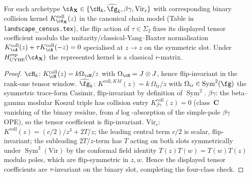 \begin{corollary}
\label{cor:r-matrix-sigma2-symmetric}
For each archetype $\cA_\mathbf{X}\in\{\cH_k,\widehat{\fg}_k,
\beta\gamma,\mathrm{Vir}_c\}$ with corresponding binary collision
kernel $K^{\mathrm{coll}}_{\cA_\mathbf{X}}(z)$ in the canonical chain model
(Table in \texttt{landscape\_census.tex}), the flip action of
$\tau\in\Sigma_2$ fixes its displayed tensor coefficient modulo the
unitarity/classical-Yang--Baxter normalisation
$K_\cA^{\mathrm{coll}}(z)
+\tau K_\cA^{\mathrm{coll}}(-z)=0$ specialised at $z\to z$ on the
symmetric slot.  Under~$H_{\mathrm{CYBE}}^{\mathrm{rep}}(\cA_\mathbf X)$
the represented kernel is a classical $r$-matrix.
\end{corollary}

\begin{proof}
$\cH_k$: $K^{\mathrm{coll}}_{\cH}(z)=k\Omega_{\cH}/z$ with
$\Omega_{\cH}=J\otimes J$, hence flip-invariant in the rank-one tensor
window. $\widehat{\fg}_k$: $K^{\mathrm{coll},KM}(z)=k\,\Omega_{\mathrm{tr}}/z$
with $\Omega_{\mathrm{tr}}\in\operatorname{Sym}^2(\fg)$ the symmetric
trace-form Casimir, flip-invariant by definition of
$\operatorname{Sym}^2$. $\beta\gamma$: the beta--gamma modular
Koszul triple has collision entry
$K^{\mathrm{coll}}_{\beta\gamma}(z)=0$ (class~$\mathbf{C}$ vanishing
of the binary residue, from $d\log$-absorption of the simple-pole
$\beta\gamma$ OPE), so the tensor coefficient is flip-invariant.
$\mathrm{Vir}_c$: $K^{\mathrm{coll}}(z)=(c/2)/z^3+2T/z$; the leading central term
$c/2$ is scalar, flip-invariant; the subleading $2T/z$-term has
$T$ acting on both slots symmetrically under
$\operatorname{Sym}^2(\mathrm{Vir})$ by the conformal field identity
$T(z)T(w)=T(w)T(z)$ modulo poles, which are flip-symmetric in
$z,w$. Hence the displayed tensor coefficients are $\tau$-invariant
on the binary slot, completing the four-class check.
\end{proof}

